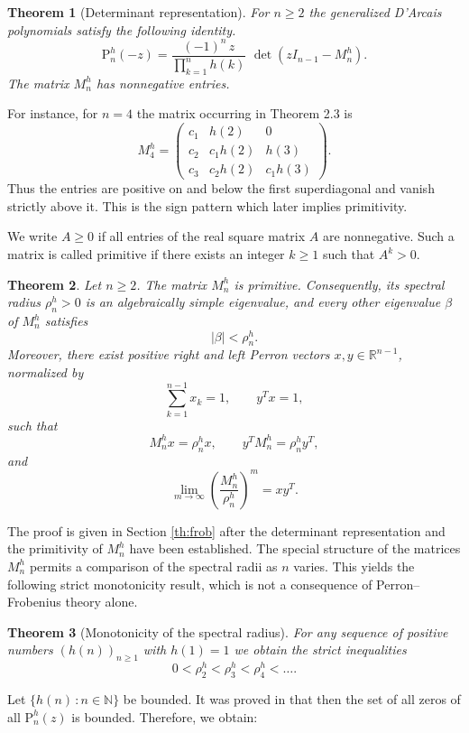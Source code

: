 \documentclass[11pt,reqno]{amsart}
\newcommand{\N}{\mathbb N}
\theoremstyle{plain}
\newtheorem{theorem}{Theorem}[section]
\theoremstyle{remark}
\theoremstyle{definition}
\numberwithin{equation}{section}
\newcommand{\pol}{\mathrm{P}}
\begin{document}
\begin{theorem}[Determinant representation] \label{th:Hessenberg}
For $n\ge2$ the generalized D'Arcais polynomials satisfy the following identity.
\begin{equation*}
\pol _n^h(-z)
= \frac{(-1)^n \, z}{
\prod_{k=1}^n h(k)} \,\,
\det\!\left(zI_{n-1}-M_n^h\right).
\end{equation*}
The matrix $M_n^h$ has nonnegative entries.
\end{theorem}
For instance, for $n=4$ the matrix occurring in Theorem 2.3 is
\[
M^h_4=
\begin{pmatrix}
 c_1 & h(2)&0\\
 c_2 & c_1h(2)&h(3)\\
 c_3 & c_2h(2)&c_1h(3)
\end{pmatrix}.
\]
%
%
%
Thus the entries are positive on and below the first superdiagonal and vanish strictly above it. This is the sign pattern which later implies primitivity.






We write $A\geq 0$ if all entries of the real square matrix $A$ are
nonnegative. Such a matrix is called primitive if there exists an integer
$k\geq 1$ such that $A^k>0$.



\begin{theorem}
\label{th:primitive}
Let \(n\geq 2\). The matrix \(M_n^h\) is primitive. Consequently, its
spectral radius \(\rho_n^h>0\) is an algebraically simple eigenvalue, and every
other eigenvalue \(\beta \) of \(M_n^h\) satisfies
\[
|\beta |<\rho_n^h.
\]
Moreover, there exist positive right and left Perron vectors
\(x,y\in\mathbb R^{n-1}\), normalized by
\[
\sum_{k=1}^{n-1}x_k=1,
\qquad
 y^T x=1,
\]
such that
\[
M_n^h x=\rho_n^h x,
\qquad
 y^T M_n^h=\rho_n^h y^T,
\]
and
\[
\lim_{m\to\infty}
\left(\frac{M_n^h}{\rho_n^h}\right)^m
=
xy^T.
\]
\end{theorem}

The proof is given in Section 
\ref{th:frob} 
after the determinant
representation and the primitivity of $M_n^h$ have been established.
The special structure of the matrices \(M_n^h\) permits a comparison of the spectral radii as \(n\) varies. This yields the following strict monotonicity result, which is not a consequence of Perron--Frobenius theory alone.
\begin{theorem}[Monotonicity of the spectral radius] \label{th:Mono}
For any sequence of positive numbers 
$\left( h(n)\right) _{n \geq 1} $ with $h(1)=1$ we obtain the strict inequalities
\begin{equation*}
0 < \rho_2^h < \rho_3^h < \rho_4^h < \ldots .
\end{equation*}
\end{theorem}
Let $\{ h(n)\,: n \in \N\}$ be bounded.
It was proved in \cite{HN24} that then the
set of all zeros of all $\pol _n^h(z)$ is bounded. Therefore, we obtain:
\end{document}

